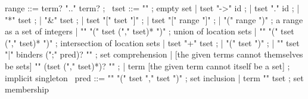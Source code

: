 \begin{syntax}
  range ::= term? ".." term? ;
       \
  tset ::= "\empty" ; empty set
       | tset "->" id ;
       | tset "." id ;
       | "*" tset ;
       | "&" tset ;
       | tset "[" tset "]" ;
       | tset "[" range "]" ;
       | "(" range ")" ; a range as a set of integers
       | "\union" "(" tset ("," tset)* ")" ; union of location sets
       | "\inter" "(" tset ("," tset)* ")" ; intersection of location sets
       | tset "+" tset ;
       | "(" tset ")" ;
       | "{" tset "|" binders (";" pred)? "}" ; set comprehension
       | {[the given terms cannot themselves be sets] 
          "{" (tset ("," tset)*)? "}" };
       | term [the given term cannot itself be a set] ; implicit singleton
       \
  pred ::= "\subset" "(" tset "," tset ")" ; set inclusion
       | term "\in" tset ; set membership
\end{syntax}

